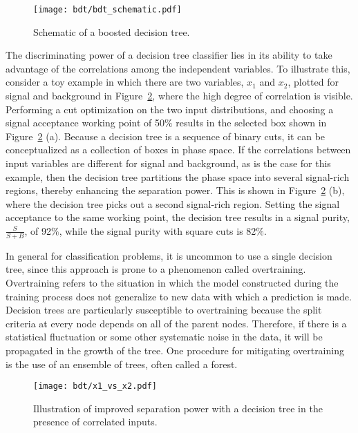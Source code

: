 \begin{figure}[h]
    \centering
    \texttt{[image: bdt/bdt\_schematic.pdf]}
    \caption[Schematic of a boosted decision tree]{Schematic of a boosted decision tree.~\cite{bib:Therhaag:2009dp}}
\label{chap:bdt:fig:bdt_schem}
\end{figure}

The discriminating power of a decision tree classifier lies in its ability to take advantage of
the correlations among the independent variables. To illustrate this,
consider a toy example in which there are two variables, $x_1$ and
$x_2$, plotted for signal and background in
Figure~\ref{chap:bdt:fig:x1_x2}, where the high degree of
correlation is visible. Performing a cut optimization on the two input
distributions, and choosing a signal acceptance working point of
50$\%$ results in the selected box shown in
Figure~\ref{chap:bdt:fig:x1_x2} (a). Because a decision tree is a
sequence of binary cuts, it can be conceptualized as a collection of
boxes in phase space. If the correlations between input variables are
different for signal and background, as is the case for this
example, then the decision tree partitions the phase space into
several signal-rich regions, thereby enhancing the separation
power. This is shown in Figure~\ref{chap:bdt:fig:x1_x2} (b), where the
decision tree picks out a second signal-rich region. Setting the
signal acceptance to the same working point, the decision tree results
in a signal purity, $\frac{S}{S+B}$, of 92$\%$, while the signal purity
with square cuts is 82$\%$.

In general for classification problems, it is uncommon to use a single
decision tree, since this approach is prone to a phenomenon called
overtraining. Overtraining refers to the situation in which the model
constructed during the training process does not generalize to new data
with which a prediction is made. Decision trees are particularly
susceptible to overtraining because the split criteria at
every node depends on all of the parent nodes. Therefore, if there is
a statistical fluctuation or some other systematic noise in the data,
it will be propagated in the growth of the tree. One procedure for
mitigating overtraining is the use of an ensemble of trees, often
called a forest. 

\begin{figure}[h]
    \centering
    \texttt{[image: bdt/x1\_vs\_x2.pdf]}
    \caption[Rectangular cuts vs. decision tree]{Illustration of improved separation power with a decision
    tree in the presence of correlated inputs.}
\label{chap:bdt:fig:x1_x2}
\end{figure}

